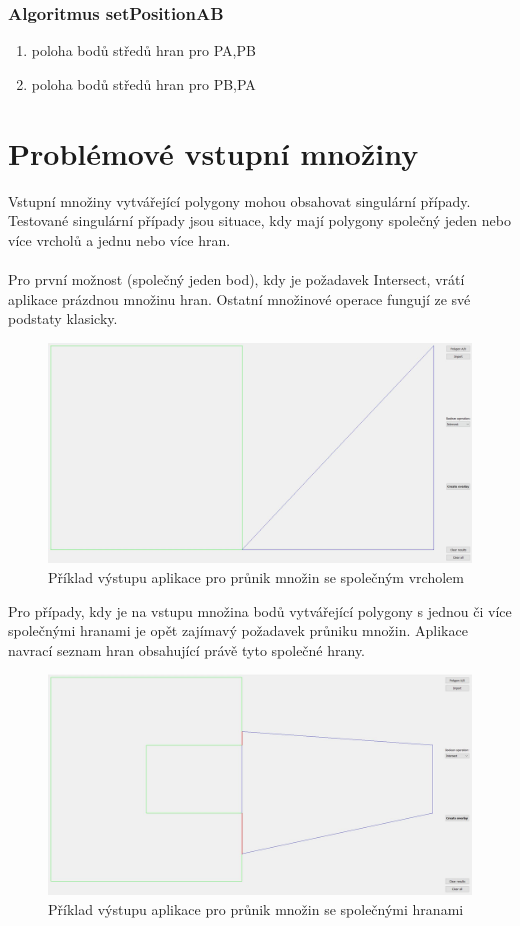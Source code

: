 \documentclass[a4paper, 12pt]{article}
\begin{document}
\subsubsection{Algoritmus setPositionAB}
\begin{enumerate}
\item poloha bodů středů hran pro PA,PB
\item poloha bodů středů hran pro PB,PA
\end{enumerate}

\newpage

\section{Problémové vstupní množiny}
Vstupní množiny vytvářející polygony mohou obsahovat singulární případy. Testované singulární případy jsou situace, kdy mají polygony společný jeden nebo více vrcholů a jednu nebo více hran.\\
\\
Pro první možnost (společný jeden bod), kdy je požadavek Intersect, vrátí aplikace prázdnou množinu hran. Ostatní množinové operace fungují ze své podstaty klasicky.

\begin{figure}[h!]
	\centering
	\includegraphics[width=12cm]{one_point.jpg}
	\caption{Příklad výstupu aplikace pro průnik množin se společným vrcholem}
\end{figure}

Pro případy, kdy je na vstupu množina bodů vytvářející polygony s jednou či více společnými hranami je opět zajímavý požadavek průniku množin. Aplikace navrací seznam hran obsahující právě tyto společné hrany.

\begin{figure}[h!]
	\centering
	\includegraphics[width=12cm]{same_edges.jpg}
	\caption{Příklad výstupu aplikace pro průnik množin se společnými hranami}
\end{figure}
\end{document}
